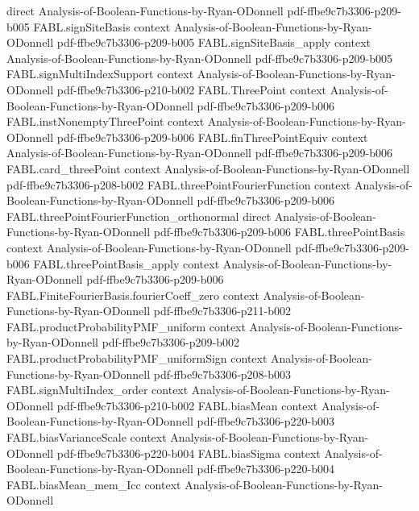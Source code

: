 \begin{theorem}
  {direct}
  {Analysis-of-Boolean-Functions-by-Ryan-ODonnell}
  {pdf-ffbe9c7b3306-p209-b005}
\proofstep
  {FABL.signSiteBasis}
  {context}
  {Analysis-of-Boolean-Functions-by-Ryan-ODonnell}
  {pdf-ffbe9c7b3306-p209-b005}
\proofstep
  {FABL.signSiteBasis_apply}
  {context}
  {Analysis-of-Boolean-Functions-by-Ryan-ODonnell}
  {pdf-ffbe9c7b3306-p209-b005}
\proofstep
  {FABL.signMultiIndexSupport}
  {context}
  {Analysis-of-Boolean-Functions-by-Ryan-ODonnell}
  {pdf-ffbe9c7b3306-p210-b002}
\proofstep
  {FABL.ThreePoint}
  {context}
  {Analysis-of-Boolean-Functions-by-Ryan-ODonnell}
  {pdf-ffbe9c7b3306-p209-b006}
\proofstep
  {FABL.instNonemptyThreePoint}
  {context}
  {Analysis-of-Boolean-Functions-by-Ryan-ODonnell}
  {pdf-ffbe9c7b3306-p209-b006}
\proofstep
  {FABL.finThreePointEquiv}
  {context}
  {Analysis-of-Boolean-Functions-by-Ryan-ODonnell}
  {pdf-ffbe9c7b3306-p209-b006}
\proofstep
  {FABL.card_threePoint}
  {context}
  {Analysis-of-Boolean-Functions-by-Ryan-ODonnell}
  {pdf-ffbe9c7b3306-p208-b002}
\proofstep
  {FABL.threePointFourierFunction}
  {context}
  {Analysis-of-Boolean-Functions-by-Ryan-ODonnell}
  {pdf-ffbe9c7b3306-p209-b006}
\proofstep
  {FABL.threePointFourierFunction_orthonormal}
  {direct}
  {Analysis-of-Boolean-Functions-by-Ryan-ODonnell}
  {pdf-ffbe9c7b3306-p209-b006}
\proofstep
  {FABL.threePointBasis}
  {context}
  {Analysis-of-Boolean-Functions-by-Ryan-ODonnell}
  {pdf-ffbe9c7b3306-p209-b006}
\proofstep
  {FABL.threePointBasis_apply}
  {context}
  {Analysis-of-Boolean-Functions-by-Ryan-ODonnell}
  {pdf-ffbe9c7b3306-p209-b006}
\proofstep
  {FABL.FiniteFourierBasis.fourierCoeff_zero}
  {context}
  {Analysis-of-Boolean-Functions-by-Ryan-ODonnell}
  {pdf-ffbe9c7b3306-p211-b002}
\proofstep
  {FABL.productProbabilityPMF_uniform}
  {context}
  {Analysis-of-Boolean-Functions-by-Ryan-ODonnell}
  {pdf-ffbe9c7b3306-p209-b002}
\proofstep
  {FABL.productProbabilityPMF_uniformSign}
  {context}
  {Analysis-of-Boolean-Functions-by-Ryan-ODonnell}
  {pdf-ffbe9c7b3306-p208-b003}
\proofstep
  {FABL.signMultiIndex_order}
  {context}
  {Analysis-of-Boolean-Functions-by-Ryan-ODonnell}
  {pdf-ffbe9c7b3306-p210-b002}
\proofstep
  {FABL.biasMean}
  {context}
  {Analysis-of-Boolean-Functions-by-Ryan-ODonnell}
  {pdf-ffbe9c7b3306-p220-b003}
\proofstep
  {FABL.biasVarianceScale}
  {context}
  {Analysis-of-Boolean-Functions-by-Ryan-ODonnell}
  {pdf-ffbe9c7b3306-p220-b004}
\proofstep
  {FABL.biasSigma}
  {context}
  {Analysis-of-Boolean-Functions-by-Ryan-ODonnell}
  {pdf-ffbe9c7b3306-p220-b004}
\proofstep
  {FABL.biasMean_mem_Icc}
  {context}
  {Analysis-of-Boolean-Functions-by-Ryan-ODonnell}

\end{theorem}
